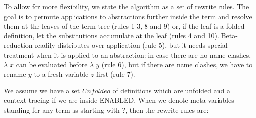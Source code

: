 \documentclass[a4paper]{article}
\begin{document}
To allow for more flexibility, we state the algorithm as a set of rewrite
 rules. The goal is to permute applications to abstractions further inside the
 term and resolve them at the leaves of the term tree (rules 1-3, 8 and 9) or,
 if the leaf is a folded definition, let the substitutions accumulate at the
 leaf (rules 4 and 10). Beta-reduction readily distributes over application
 (rule 5), but it needs special treatment when it is applied to an abstraction:
 in case there are no name clashes, $\lambda\; x$ can be evaluated before
 $\lambda\; y$ (rule 6), but if there are name clashes, we have to rename
 $y$ to a fresh variable $z$ first (rule 7).


We assume we have a set $Unfolded$ of definitions which are unfolded and
 a context tracing if we are inside ENABLED. When we denote meta-variables
 standing for any term as starting with ?, then the rewrite rules are:\\
\end{document}
